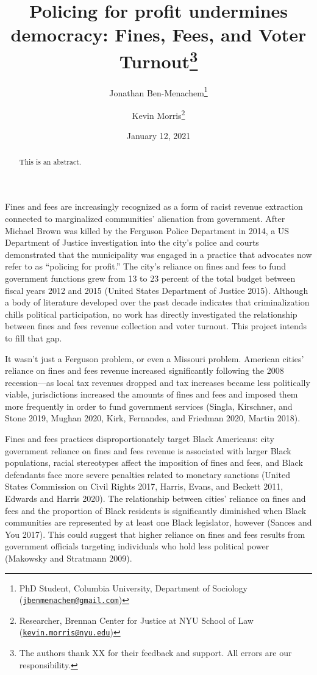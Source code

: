 \documentclass[
  12pt,
]{article}
\title{Policing for profit undermines democracy: Fines, Fees, and Voter Turnout\thanks{The authors thank XX for their feedback and support. All errors are our responsibility.}}
\author{Jonathan Ben-Menachem\footnote{PhD Student, Columbia University, Department of Sociology (\href{mailto:jbenmenachem@gmail.com}{\nolinkurl{jbenmenachem@gmail.com}})} \and Kevin Morris\footnote{Researcher, Brennan Center for Justice at NYU School of Law (\href{mailto:kevin.morris@nyu.edu}{\nolinkurl{kevin.morris@nyu.edu}})}}
\date{January 12, 2021}
\begin{document}
\maketitle
\begin{abstract}
This is an abstract.
\end{abstract}

\pagebreak


Fines and fees are increasingly recognized as a form of racist revenue extraction connected to marginalized communities' alienation from government. After Michael Brown was killed by the Ferguson Police Department in 2014, a US Department of Justice investigation into the city's police and courts demonstrated that the municipality was engaged in a practice that advocates now refer to as ``policing for profit.'' The city's reliance on fines and fees to fund government functions grew from 13 to 23 percent of the total budget between fiscal years 2012 and 2015 (United States Department of Justice 2015). Although a body of literature developed over the past decade indicates that criminalization chills political participation, no work has directly investigated the relationship between fines and fees revenue collection and voter turnout. This project intends to fill that gap.

It wasn't just a Ferguson problem, or even a Missouri problem. American cities' reliance on fines and fees revenue increased significantly following the 2008 recession---as local tax revenues dropped and tax increases became less politically viable, jurisdictions increased the amounts of fines and fees and imposed them more frequently in order to fund government services (Singla, Kirschner, and Stone 2019, Mughan 2020, Kirk, Fernandes, and Friedman 2020, Martin 2018).

Fines and fees practices disproportionately target Black Americans: city government reliance on fines and fees revenue is associated with larger Black populations, racial stereotypes affect the imposition of fines and fees, and Black defendants face more severe penalties related to monetary sanctions (United States Commission on Civil Rights 2017, Harris, Evans, and Beckett 2011, Edwards and Harris 2020). The relationship between cities' reliance on fines and fees and the proportion of Black residents is significantly diminished when Black communities are represented by at least one Black legislator, however (Sances and You 2017). This could suggest that higher reliance on fines and fees results from government officials targeting individuals who hold less political power (Makowsky and Stratmann 2009).
\end{document}
